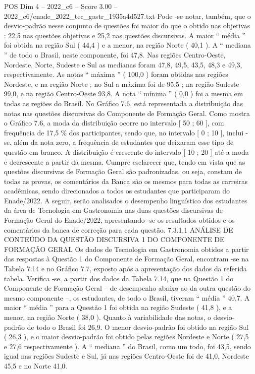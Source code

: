 \begin{textsample}{POS Dim 4 – 2022\_c6 – Score 3.00 – 2022\_c6/enade\_2022\_tec\_gastr\_1935a4d527.txt}
Pode -se notar, também, que o desvio-padrão nesse conjunto de questões foi maior do que o obtido nas objetivas : 22,5 nas questões objetivas e 25,2 nas questões discursivas.
A maior “ média ” foi obtida na região Sul ( 44,4 ) e a menor, na região Norte ( 40,1 ).
A “ mediana ” de todo o Brasil, neste componente, foi 47,8.
Nas regiões Centro-Oeste, Nordeste, Norte, Sudeste e Sul as medianas foram 47,8, 49,5, 43,5, 48,3 e 49,3, respectivamente.
As notas “ máxima ” ( 100,0 ) foram obtidas nas regiões Nordeste, e na região Norte ; no Sul a máxima foi de 95,5 ; na região Sudeste 99,0, e na região Centro-Oeste 93,8.
A nota “ mínima ” ( 0,0 ) foi a mesma em todas as regiões do Brasil.
No Gráfico 7.6, está representada a distribuição das notas nas questões discursivas do Componente de Formação Geral.
Como mostra o Gráfico 7.6, a moda da distribuição ocorre no intervalo [ 50 ; 60 ], com frequência de 17,5 \% dos participantes, sendo que, no intervalo [ 0 ; 10 ], inclui -se, além da nota zero, a frequência de estudantes que deixaram esse tipo de questão em branco.
A distribuição é crescente do intervalo [ 10 ; 20 ] até a moda e decrescente a partir da mesma.
Cumpre esclarecer que, tendo em vista que as questões discursivas de Formação Geral são padronizadas, ou seja, constam de todas as provas, os comentários da Banca são os mesmos para todas as carreiras acadêmicas, sendo direcionados a todos os estudantes que participaram do Enade/2022.
A seguir, serão analisados o desempenho linguístico dos estudantes da área de Tecnologia em Gastronomia nas duas questões discursivas de Formação Geral do Enade/2022, apresentando -se os resultados obtidos e os comentários da banca de correção para cada questão. 7.3.1.1 ANÁLISE DE CONTEÚDO DA QUESTÃO DISCURSIVA 1 DO COMPONENTE DE FORMAÇÃO GERAL Os dados de Tecnologia em Gastronomia obtidos a partir das respostas à Questão 1 do Componente de Formação Geral, encontram -se na Tabela 7.14 e no Gráfico 7.7, exposto após a apresentação dos dados da referida tabela.
Verifica -se, a partir dos dados da Tabela 7.14, que na Questão 1 do Componente de Formação Geral – de desempenho abaixo ao da outra questão do mesmo componente –, os estudantes, de todo o Brasil, tiveram “ média ” 40,7.
A maior “ média ” para a Questão 1 foi obtida na região Sudeste ( 41,8 ), e a menor, na região Norte ( 38,0 ).
Quanto à variabilidade das notas, o desvio-padrão de todo o Brasil foi 26,9.
O menor desvio-padrão foi obtido na região Sul ( 26,3 ), e o maior desvio-padrão foi obtido pelas regiões Nordeste e Norte ( 27,5 e 27,6 respectivamente ).
A “ mediana ” do Brasil, como um todo, foi 43,5, sendo igual nas regiões Sudeste e Sul, já nas regiões Centro-Oeste foi de 41,0, Nordeste 45,5 e no Norte 41,0.

\end{textsample}

